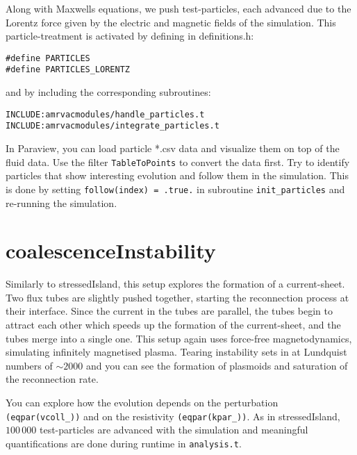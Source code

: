 \documentclass[10pt]{article}
\begin{document}
Along with Maxwells equations, we push test-particles, each advanced due to the Lorentz force given by the electric and magnetic fields of the simulation.  
This particle-treatment is activated by defining in definitions.h:\\
\begin{verbatim}
#define PARTICLES
#define PARTICLES_LORENTZ
\end{verbatim}

and by including the corresponding subroutines:
\begin{verbatim}
INCLUDE:amrvacmodules/handle_particles.t
INCLUDE:amrvacmodules/integrate_particles.t
\end{verbatim}

In Paraview, you can load particle *.csv data and visualize them on top of the fluid data.  Use the filter {\tt TableToPoints} to convert the data first.  
Try to identify particles that show interesting evolution and follow them in the simulation.  This is done by setting {\tt follow(index) = .true.} in subroutine {\tt init\_particles} and re-running the simulation.  

\section*{coalescenceInstability}

Similarly to stressedIsland, this setup explores the formation of a current-sheet.  Two flux tubes are slightly pushed together, starting the reconnection process at their interface.  Since the current in the tubes are parallel, the tubes begin to attract each other which speeds up the formation of the current-sheet, and the tubes merge into a single one.  This setup again uses force-free magnetodynamics, simulating infinitely magnetised plasma.  Tearing instability sets in at Lundquist numbers of $\sim2000$ and you can see the formation of plasmoids and saturation of the reconnection rate.  

You can explore how the evolution depends on the perturbation {\tt (eqpar(vcoll\_))} and on the resistivity {\tt (eqpar(kpar\_))}.  
As in stressedIsland, $100\,000$ test-particles are advanced with the simulation and meaningful quantifications are done during runtime in {\tt analysis.t}.  
\end{document}
